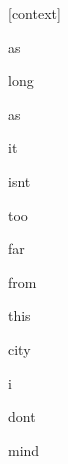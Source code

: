 \documentclass[varwidth]{standalone}
\begin{document}
\begin{CJK*}{UTF8}{gbsn}
{\setlength{\fboxsep}{0pt}\colorbox{white!0}{\parbox{0.9\textwidth}{
\colorbox{red!0.0032632932998239994}{\strut [context]} \colorbox{red!0.0004183161654509604}{\strut as} \colorbox{red!0.005978959612548351}{\strut long} \colorbox{red!0.0017036376520991325}{\strut as} \colorbox{red!0.0002726683160290122}{\strut it} \colorbox{red!3.8673300743103027}{\strut isnt} \colorbox{red!0.26102882623672485}{\strut too} \colorbox{red!0.10982111841440201}{\strut far} \colorbox{red!0.038634154945611954}{\strut from} \colorbox{red!0.02777058631181717}{\strut this} \colorbox{red!0.46108680963516235}{\strut city} \colorbox{red!1.4199151992797852}{\strut i} \colorbox{red!62.565040588378906}{\strut dont} \colorbox{red!31.237728118896484}{\strut mind} 
}}}
\end{CJK*}
\end{document}
